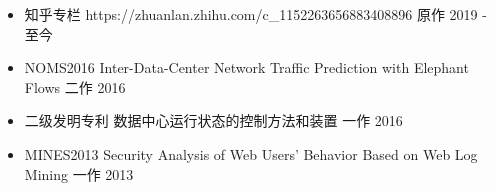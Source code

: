 

\begin{cvpapers}

\begin{itemize}[parsep=0.2ex]
\item  \cvpaper
    {知乎专栏}
    {https://zhuanlan.zhihu.com/c\_1152263656883408896} %
    {原作} %
    {2019 - 至今} %

\item  \cvpaper
    {NOMS2016}
    {Inter-Data-Center Network Traffic Prediction with Elephant Flows} %
    {二作} %
    {2016} %

\item  \cvpaper
    {二级发明专利}
    {数据中心运行状态的控制方法和装置} %
    {一作} %
    {2016} %

\item  \cvpaper
    {MINES2013}
    {Security Analysis of Web Users' Behavior Based on Web Log Mining} %
    {一作} %
    {2013} %
\end{itemize}
\end{cvpapers}
